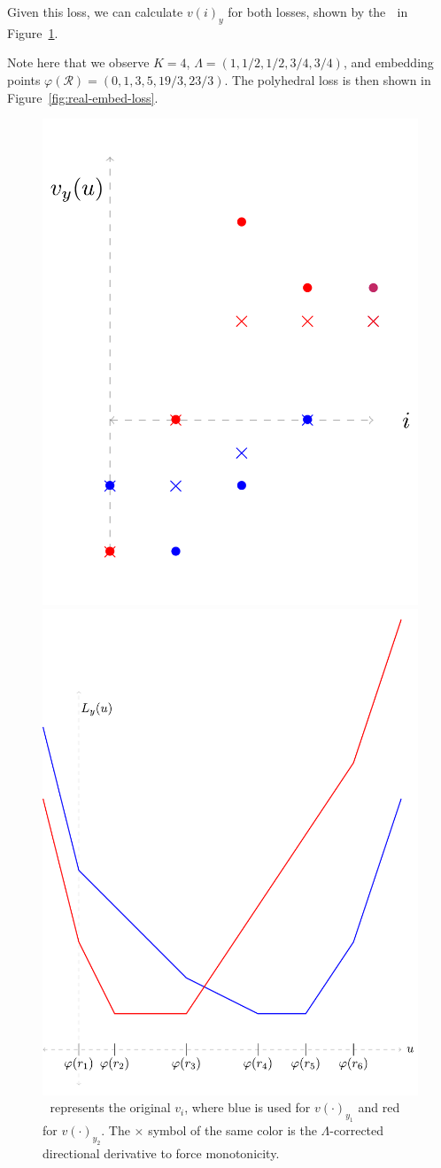 \documentclass[final]{colt2020} %
\newcommand{\R}{\mathcal{R}}
\begin{document}
Given this loss, we can calculate $v(i)_y$ for both losses, shown by the \textbullet $\;$ in Figure~\ref{fig:real-embed-vs}.

Note here that we observe $K = 4$, $\Lambda = (1, 1/2, 1/2, 3/4, 3/4)$, and embedding points $\varphi(\R) = (0,1,3,5, 19/3, 23/3)$.
The polyhedral loss is then shown in Figure~\ref{fig:real-embed-loss}.

\begin{figure}
	\begin{minipage}{0.45\linewidth}
	\centering
	\includegraphics[width=0.7\linewidth]{tikz/real-embed-vs}
	\caption{\textbullet $\;$ represents the original $v_i$, where blue is used for $v(\cdot)_{y_1}$ and red for $v(\cdot)_{y_2}$.  The $\times$ symbol of the same color is the $\Lambda$-corrected directional derivative to force monotonicity.}
	\label{fig:real-embed-vs}	
\end{minipage}
\hfill
\begin{minipage}{0.45\linewidth}
	\centering
	\includegraphics[width=0.7\linewidth]{tikz/real-embed-loss}

\end{minipage}
\end{figure}
\end{document}
